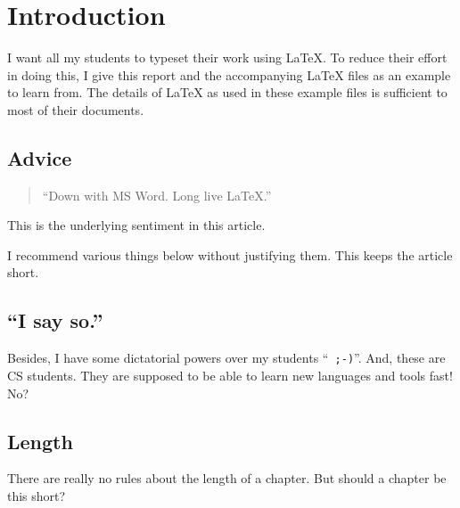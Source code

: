 \chapter{Introduction}

I want all my students to typeset their work using \LaTeX{}.  To
reduce their effort in doing this, I give this report and the
accompanying \LaTeX{} files as an example to learn from.  The details
of \LaTeX{} as used in these example files is sufficient to most of
their documents.

\section{Advice}

\begin{quote}
{\hfill{}``Down with MS Word. Long live \LaTeX.}''  
\end{quote}

\noindent
This is the underlying sentiment in this article.

I recommend various things below without justifying them.  This keeps
the article short.

\section{``I say so.''}

Besides, I have some dictatorial powers over my students ``{\tt
  ;-)}''.  And, these are CS students.  They are supposed to be able
to learn new languages and tools fast!  No?

\section{Length}

There are really no rules about the length of a chapter.  But should a
chapter be this short?

